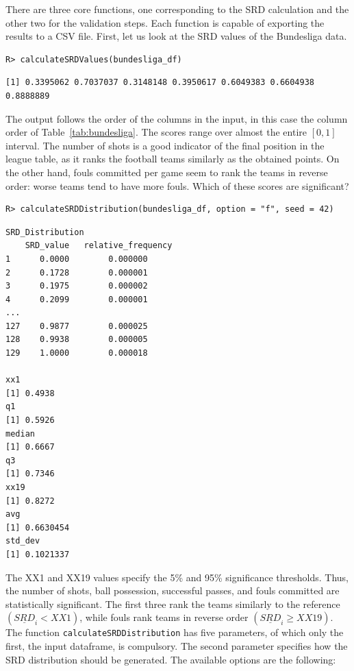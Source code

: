There are three core functions, one corresponding to the SRD calculation and the other two for the validation steps. Each function is capable of exporting the results to a CSV file.
First, let us look at the SRD values of the Bundesliga data.

\begin{verbatim}
R> calculateSRDValues(bundesliga_df)
\end{verbatim}
\begin{verbatim}
[1] 0.3395062 0.7037037 0.3148148 0.3950617 0.6049383 0.6604938 0.8888889
\end{verbatim}

The output follows the order of the columns in the input, in this case the column order of Table~\ref{tab:bundesliga}. The scores range over almost the entire $[0,1]$ interval.
The number of shots is a good indicator of the final position in the league table, as it ranks the football teams similarly as the obtained points. On the other hand, fouls committed per game seem to rank the teams in reverse order: worse teams tend to have more fouls. Which of these scores are significant?

\begin{verbatim}
R> calculateSRDDistribution(bundesliga_df, option = "f", seed = 42)
\end{verbatim}
\begin{verbatim}
SRD_Distribution
    SRD_value   relative_frequency
1      0.0000        0.000000
2      0.1728        0.000001
3      0.1975        0.000002
4      0.2099        0.000001
...
127    0.9877        0.000025
128    0.9938        0.000005
129    1.0000        0.000018

xx1
[1] 0.4938
q1
[1] 0.5926
median
[1] 0.6667
q3
[1] 0.7346
xx19
[1] 0.8272
avg
[1] 0.6630454
std_dev
[1] 0.1021337
\end{verbatim}

The XX1 and XX19 values specify the 5\% and 95\% significance thresholds. Thus, the number of shots, ball possession, successful passes, and fouls committed are statistically significant. The first three rank the teams similarly to the reference $(\underline{SRD}_i<XX1)$, while fouls rank teams in reverse order $(\underline{SRD}_i\ge XX19)$. The function \texttt{calculateSRDDistribution} has five parameters, of which only the first, the input dataframe, is compulsory. The second parameter specifies how the SRD distribution should be generated. The available options are the following:

